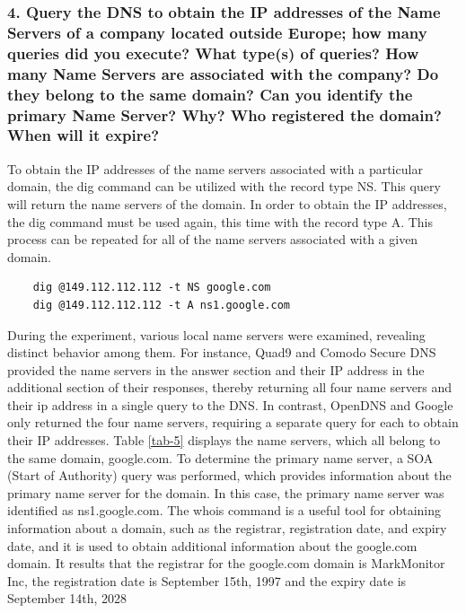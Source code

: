 \documentclass[eng]{class}
\begin{document}
\subsubsection*{4. Query the DNS to obtain the IP addresses of the Name Servers of a company
  located outside Europe; how many queries did you execute? What type(s) of
  queries? How many Name Servers are associated with the company? Do they
  belong to the same domain? Can you identify the primary Name Server? Why?
  Who registered the domain? When will it expire?}
To obtain the IP addresses of the name servers associated with a particular domain, the dig command can be utilized with the record type NS.
This query will return the name servers of the domain.
In order to obtain the IP addresses, the dig command must be used again, this time with the record type A.
This process can be repeated for all of the name servers associated with a given domain.
\begin{lstlisting}
    dig @149.112.112.112 -t NS google.com
    dig @149.112.112.112 -t A ns1.google.com
\end{lstlisting}
During the experiment, various local name servers were examined, revealing distinct behavior among them.
For instance, Quad9 and Comodo Secure DNS provided the name servers in the answer section and their IP address in the additional section of their responses,
thereby returning all four name servers and their ip address in a single query to the DNS.
In contrast, OpenDNS and Google only returned the four name servers, requiring a separate query for each to obtain their IP addresses.\newline
Table \ref*{tab-5} displays the name servers, which all belong to the same domain, google.com.\newline
To determine the primary name server, a SOA (Start of Authority) query was performed,
which provides information about the primary name server for the domain.
In this case, the primary name server was identified as ns1.google.com.\newline
\noindent
The whois command is a useful tool for obtaining information about a domain, such as the registrar, registration date, and expiry date,
and it is used to obtain additional information about the google.com domain.
It results that the registrar for the  google.com domain is MarkMonitor Inc, the registration date is September 15th, 1997 and the expiry date is September 14th, 2028
\end{document}
